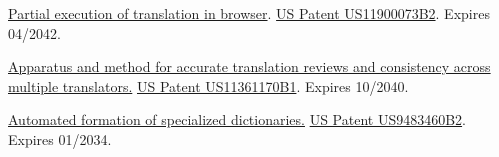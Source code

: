 
\href{https://patents.google.com/patent/US20230070302A1}{Partial execution of translation in browser}. \hypersetup{urlcolor=black}\href{https://patents.google.com/patent/US20230070302A1}{US Patent US11900073B2}\hypersetup{urlcolor=linkcol}. Expires 04/2042.%

\href{https://patents.google.com/patent/US11361170B1}{Apparatus and method for accurate translation reviews and consistency across multiple translators.} \hypersetup{urlcolor=black}\href{https://patents.google.com/patent/US11361170B1}{US Patent US11361170B1}\hypersetup{urlcolor=linkcol}. Expires 10/2040. %

\href{https://patents.google.com/patent/US9483460B2}{Automated formation of specialized dictionaries.} \hypersetup{urlcolor=black}\href{https://patents.google.com/patent/US9483460B2}{US Patent US9483460B2}\hypersetup{urlcolor=linkcol}. Expires 01/2034.\\ %

